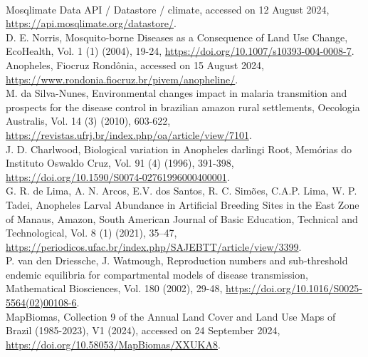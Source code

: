 \documentclass[a4paper,fleqn]{cas-dc}
\begin{document}
\begin{thebibliography}{00}
\\
 Mosqlimate Data API / Datastore / climate, accessed on 12 August 2024, \href{https://api.mosqlimate.org/datastore/}{https://api.mosqlimate.org/datastore/}.
\\
 D. E. Norris, Mosquito-borne Diseases as a Consequence of Land Use Change, EcoHealth, Vol. 1 (1) (2004), 19-24, \href{https://doi.org/10.1007/s10393-004-0008-7}{https://doi.org/10.1007/s10393-004-0008-7}.
\\
 Anopheles, Fiocruz Rondônia, accessed on 15 August 2024, \href{https://www.rondonia.fiocruz.br/pivem/anopheline/}{https://www.rondonia.fiocruz.br/pivem/anopheline/}.
\\
 M. da Silva-Nunes, Environmental changes impact in malaria transmition and prospects for the disease control in brazilian amazon rural settlements, Oecologia Australis, Vol. 14 (3) (2010), 603-622, \href{https://revistas.ufrj.br/index.php/oa/article/view/7101}{https://revistas.ufrj.br/index.php/oa/article/view/7101}.
\\
 J. D. Charlwood, Biological variation in Anopheles darlingi Root, Memórias do Instituto Oswaldo Cruz, Vol. 91 (4) (1996), 391-398, \href{ https://doi.org/10.1590/S0074-02761996000400001}{ https://doi.org/10.1590/S0074-02761996000400001}.
\\
 G. R. de Lima, A. N. Arcos, E.V. dos Santos, R. C. Simões, C.A.P. Lima, W. P. Tadei, Anopheles Larval Abundance in Artificial Breeding Sites in the 
East Zone of Manaus, Amazon, South American Journal of Basic Education, Technical and Technological, Vol. 8 (1) (2021), 35–47, \href{https://periodicos.ufac.br/index.php/SAJEBTT/article/view/3399}{ https://periodicos.ufac.br/index.php/SAJEBTT/article/view/3399}.
\\
 P. van den Driessche, J. Watmough, Reproduction numbers and sub-threshold endemic equilibria for compartmental models of disease transmission, Mathematical Biosciences, Vol. 180 (2002), 29-48, \href{https://doi.org/10.1016/S0025-5564(02)00108-6}{ https://doi.org/10.1016/S0025-5564(02)00108-6}.
\\
 MapBiomas, Collection 9 of the Annual Land Cover and Land Use Maps of Brazil (1985-2023), V1 (2024), accessed on 24 September 2024, \href{https://doi.org/10.58053/MapBiomas/XXUKA8}{https://doi.org/10.58053/MapBiomas/XXUKA8}.

\end{thebibliography}
\end{document}
